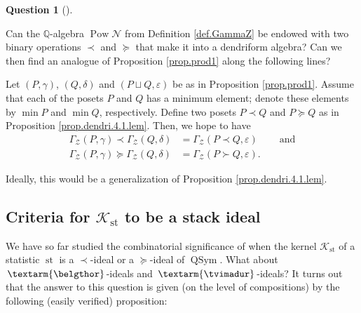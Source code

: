 \documentclass[numbers=enddot,12pt,final,onecolumn,notitlepage]{scrartcl}%
\theoremstyle{definition}
\newtheorem{quest}[theo]{Question}
\newenvironment{question}[1][]
{\begin{quest}[#1]\begin{leftbar}}
{\end{leftbar}\end{quest}}
\newenvironment{question}[1][Question]{\noindent\textbf{#1.} }{\ \rule{0.5em}{0.5em}}
\newcommand{\tvi}{\left. \textarm{\tvimadur} \right.}
\newcommand{\bel}{\left. \textarm{\belgthor} \right.}
\begin{document}
\begin{question}
Can the $\mathbb{Q}$-algebra $\operatorname*{Pow}\mathcal{N}$ from Definition
\ref{def.GammaZ} be endowed with two binary operations $\left.  \prec\right.
$ and $\left.  \succeq\right.  $ that make it into a dendriform algebra? Can
we then find an analogue of Proposition \ref{prop.prod1} along the following lines?

Let $\left(  P,\gamma\right)  $, $\left(  Q,\delta\right)  $ and $\left(
P\sqcup Q,\varepsilon\right)  $ be as in Proposition \ref{prop.prod1}. Assume
that each of the posets $P$ and $Q$ has a minimum element; denote these
elements by $\min P$ and $\min Q$, respectively. Define two posets $P\left.
\prec\right.  Q$ and $P\left.  \succeq\right.  Q$ as in Proposition
\ref{prop.dendri.4.1.lem}. Then, we hope to have%
\begin{align*}
\Gamma_{\mathcal{Z}}\left(  P,\gamma\right)  \left.  \prec\right.
\Gamma_{\mathcal{Z}}\left(  Q,\delta\right)   &  =\Gamma_{\mathcal{Z}}\left(
P\left.  \prec\right.  Q,\varepsilon\right)  \ \ \ \ \ \ \ \ \ \ \text{and}\\
\Gamma_{\mathcal{Z}}\left(  P,\gamma\right)  \left.  \succeq\right.
\Gamma_{\mathcal{Z}}\left(  Q,\delta\right)   &  =\Gamma_{\mathcal{Z}}\left(
P\left.  \succ\right.  Q,\varepsilon\right)  .
\end{align*}


Ideally, this would be a generalization of Proposition
\ref{prop.dendri.4.1.lem}.
\end{question}

\subsection{Criteria for $\mathcal{K}_{\operatorname*{st}}$ to be a stack
ideal}

We have so far studied the combinatorial significance of when the kernel
$\mathcal{K}_{\operatorname*{st}}$ of a statistic $\operatorname*{st}$ is a
$\left.  \prec\right.  $-ideal or a $\left.  \succeq\right.  $-ideal of
$\operatorname*{QSym}$. What about $\bel$-ideals and $\tvi$-ideals? It turns
out that the answer to this question is given (on the level of compositions)
by the following (easily verified) proposition:
\end{document}
